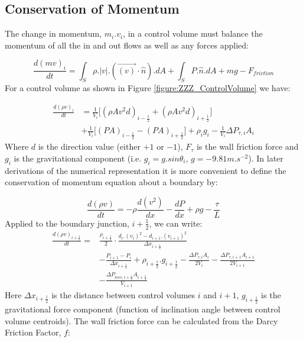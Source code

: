\documentclass[11pt,letterpaper,titlepage]{article}
\newcommand{\half}{\frac{1}{2}}
\begin{document}
\subsection{Conservation of Momentum}
The change in momentum, $m_i.v_{i}$, in a control volume must balance the momentum of all the in and out flows as well as any forces applied:

\begin{equation*}
\frac{d(mv)_i}{dt}=\int_S \rho. |v|. (\vec{(v)}\cdot \hat{n}).dA + \int_S P.\hat{n}.dA+mg-F_{friction}
\end{equation*}
\newline
\noindent For a control volume as shown in Figure \ref{figure:ZZZ_ControlVolume} we have:

\begin{equation*}
\begin{aligned}
\frac{d(\rho v)_i}{dt}&=\frac{1}{V_i} \biggr[ (\rho A v^2 d)_{i-\half} +(\rho A v^2 d)_{i+\half}  \biggr] \\
&+\frac{1}{V_i} \biggr[ (PA)_{i-\half} - (PA)_{i+\half} \biggr]+\rho_ig_i-\frac{1}{V_i}\Delta P_{\tau,i}A_i
\end{aligned}
\end{equation*}
\newline
Where $d$ is the direction value (either $+1$ or $-1$), $F_{\tau}$ is the wall friction force and $g_i$ is the gravitational component (i.e. $g_i=g.sin\theta_i$, $g=-9.81 m.s^{-2}$). In later derivations of the numerical representation it is more convenient to define the conservation of momentum equation about a boundary by:

\begin{equation*}
\frac{d(\rho v)}{dt}=-\rho \frac{d(v^2)}{dx} -\frac{dP}{dx}+\rho g - \frac{\tau}{L}
\end{equation*}
\newline
Applied to the boundary junction, $i+\half$, we can write:
\begin{equation}
\begin{aligned}
\frac{d(\rho v)_{i+\half}}{dt}=&\frac{\rho_{i+\half}}{2}\cdot\frac{d_i.(v_{i})^2-d_{i+1}.(v_{i+1})^2}{\Delta x_{i+\half}} \\
&-\frac{P_{i+1}-P_i}{\Delta x_{i+\half}} + \rho_{i+\half}.g_{i+\half}-\frac{\Delta P_{\tau,i}A_i}{2V_i}-\frac{\Delta P_{\tau,i+1}A_{i+1}}{2V_{i+1}} \\
&-\frac{\Delta P_{loss,i+\half}A_{i+\half}}{V_{i+1}}
\end{aligned}
\end{equation}
\newline
Here $\Delta x_{i+\half}$ is the distance between control volumes $i$ and $i+1$, $g_{i+\half}$ is the gravitational force component (function of inclination angle between control volume centroids). The wall friction force can be calculated from the Darcy Friction Factor, $f$:
\end{document}
